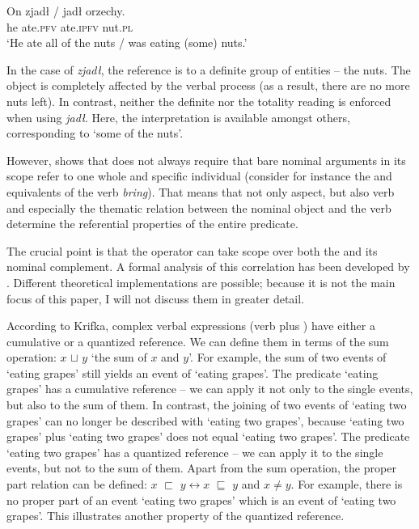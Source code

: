 \documentclass[output=paper,  modfonts,  newtxmath,  hidelinks		  ]{langscibook}
\begin{document}
\ea\label{21:8}
\gll On zjadł / jadł orzechy.\\
   he ate.\textsc{pfv} {} ate.\textsc{ipfv} nut.\textsc{pl}\\
\glt	`He ate all of the nuts / was eating (some) nuts.'
\z

\noindent In the case of \textit{zjadł}, the reference is to a definite group of entities -- the nuts. The object is completely affected by the verbal process (as a result, there are no more nuts left). In contrast, neither the definite nor the totality reading is enforced when using \textit{jadł}. Here, the  interpretation is available amongst others, corresponding to `some of the nuts'.\par However, \cite[128]{Filip2005} shows that  does not always require that bare nominal arguments in its scope refer to one whole and specific individual (consider for instance the   and  equivalents of the  verb \textit{bring}). That means that not only aspect, but also verb  and especially the thematic relation between the nominal object and the verb determine the referential properties of the entire predicate.\par 
The crucial point is that the  operator can take scope over both the  and its nominal complement. A formal analysis of this correlation has been developed by \cite{Krifka1989a,Krifka1989b,Krifka1992,Krifka1998}. Different theoretical implementations are possible; because it is not the main focus of this paper, I will not discuss them in greater detail.\par
According to Krifka, complex verbal expressions (verb plus ) have either a cumulative or a quantized reference. We can define them in terms of the sum operation: $x$ $\sqcup$ $y$ ‘the sum of $x$ and $y$’. For example, the sum of two events of ‘eating grapes’ still yields an event of ‘eating grapes’. The predicate ‘eating grapes’ has a cumulative reference – we can apply it not only to the single events, but also to the sum of them. In contrast, the joining of two events of ‘eating two grapes’ can no longer be described with ‘eating two grapes’, because ‘eating two grapes’ plus ‘eating two grapes’ does not equal ‘eating two grapes’. The predicate ‘eating two grapes’ has a quantized reference – we can apply it to the single events, but not to the sum of them. Apart from the sum operation, the proper part relation can be defined: $x$ $\sqsubset$ $y{}\leftrightarrow{}x$ $\sqsubseteq$ $y$ and $x\neq y$. For example, there is no proper part of an event ‘eating two grapes’ which is an event of ‘eating two grapes’. This illustrates another property of the quantized reference.
\end{document}
